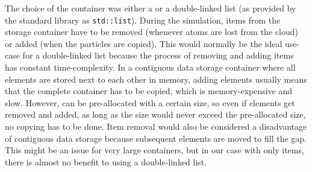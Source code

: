 The choice of the container was either a \stdvector or a double-linked list (as provided by the \Cpp standard library as \texttt{std::list}). During the simulation, items from the storage container have to be removed (whenever atoms are lost from the cloud) or added (when the particles are copied). This would normally be the ideal use-case for a double-linked list because the process of removing and adding items has constant time-complexity. In a contiguous data storage container where all elements are stored next to each other in memory, adding elements usually means that the complete container has to be copied, which is memory-expensive and slow. However, \stdvector can be pre-allocated with a certain size, so even if elements get removed and added, as long as the size would never exceed the pre-allocated size, no copying has to be done. Item removal would also be considered a disadvantage of contiguous data storage because subsequent elements are moved to fill the gap. This might be an issue for very large containers, but in our case with only  items, there is almost no benefit to using a double-linked list.

